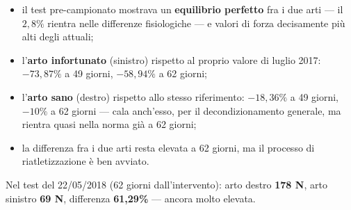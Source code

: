 \begin{itemize}
  \item il test pre-campionato mostrava un \textbf{equilibrio perfetto} fra i due arti --- il
    $2,8\%$ rientra nelle differenze fisiologiche --- e valori di forza decisamente più alti degli
    attuali;
  \item l'\textbf{arto infortunato} (sinistro) rispetto al proprio valore di luglio 2017:
    $-73,87\%$ a 49 giorni, $-58,94\%$ a 62 giorni;
  \item l'\textbf{arto sano} (destro) rispetto allo stesso riferimento: $-18,36\%$ a 49 giorni,
    $-10\%$ a 62 giorni --- cala anch'esso, per il decondizionamento generale, ma rientra quasi nella
    norma già a 62 giorni;
  \item la differenza fra i due arti resta elevata a 62 giorni, ma il processo di riatletizzazione
    è ben avviato.
\end{itemize}

Nel test del 22/05/2018 (62 giorni dall'intervento): arto destro \textbf{178 N}, arto sinistro
\textbf{69 N}, differenza \textbf{61,29\%} --- ancora molto elevata.
